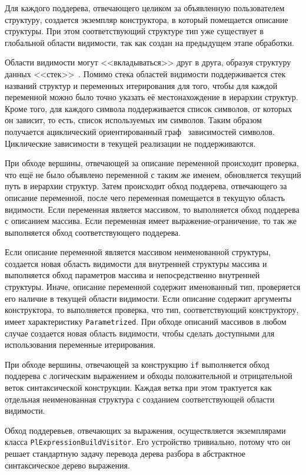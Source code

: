 \documentclass[times,specification,annotation]{style/itmo-student-thesis/itmo-student-thesis}
\begin{document}
Для каждого поддерева, отвечающего целиком за объявленную пользователем структуру, создается экземпляр конструктора, в который помещается описание структуры. При этом соответствующий структуре тип уже существует в глобальной области видимости, так как создан на предыдущем этапе обработки.

Области видимости могут <<вкладываться>> друг в друга, образуя структуру данных <<стек>>~\cite{knuth1997art}. Помимо стека областей видимости поддерживается стек названий структур и переменных итерирования для того, чтобы для каждой переменной можно было точно указать её местонахождение в иерархии структур. Кроме того, для каждого символа поддерживается список символов, от которых он зависит, то есть, список используемых им символов. Таким образом получается ациклический ориентированный граф~\cite{trudeau2013introduction} зависимостей символов. Циклические зависимости в текущей реализации не поддерживаются.

При обходе вершины, отвечающей за описание переменной происходит проверка, что ещё не было объявлено переменной с таким же именем, обновляется текущий путь в иерархии структур. Затем происходит обход поддерева, отвечающего за описание переменной, после чего переменная помещается в текущую область видимости. Если переменная является массивом, то выполняется обход поддерева с описанием массива. Если переменная имеет выражение-ограничение, то так же выполняется обход соответствующего поддерева.

Если описание переменной является массивом неименованной структуры, создается новая область видимости для внутренней структуры массива и выполняется обход параметров массива и непосредственно внутренней структуры. Иначе, описание переменной содержит именованный тип, проверяется его наличие в текущей области видимости. Если описание содержит аргументы конструктора, то выполняется проверка, что тип, соответствующий конструктору, имеет характеристику \texttt{Parametrized}. При обходе описаний массивов в любом случае создается новая область видимости, чтобы сделать доступными для использования переменные итерирования.

При обходе вершины, отвечающей за конструкцию \texttt{if} выполняется обход поддерева с логическим выражением и обходы положительной и отрицательной веток синтаксической конструкции. Каждая ветка при этом трактуется как отдельная неименованная структура с созданием соответствующей области видимости.

Обход поддеревьев, отвечающих за выражения, осуществляется экземплярами класса \texttt{PlExpressionBuildVisitor}. Его устройство тривиально, потому что он решает стандартную задачу перевода дерева разбора в абстрактное синтаксическое дерево выражения.
\end{document}
